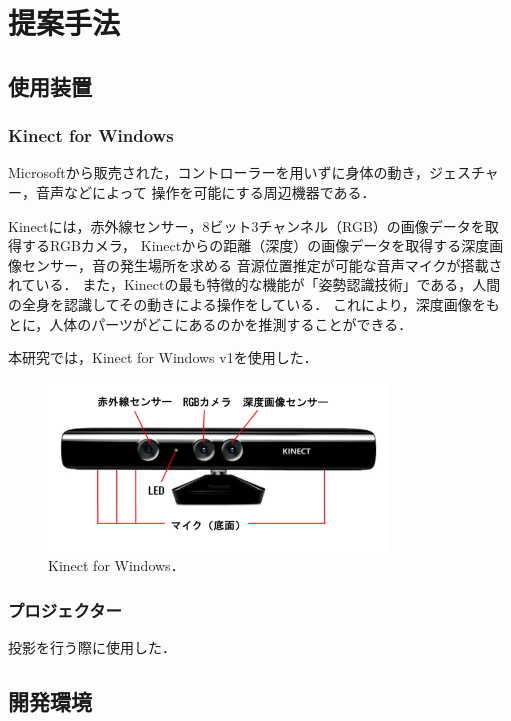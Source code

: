 \chapter{提案手法}
\thispagestyle{fancy}

\section{使用装置}
\subsection{Kinect for Windows}
Microsoftから販売された，コントローラーを用いずに身体の動き，ジェスチャー，音声などによって
操作を可能にする周辺機器である．

Kinectには，赤外線センサー，8ビット3チャンネル（RGB）の画像データを取得するRGBカメラ，
Kinectからの距離（深度）の画像データを取得する深度画像センサー，音の発生場所を求める
音源位置推定が可能な音声マイクが搭載されている．
また，Kinectの最も特徴的な機能が「姿勢認識技術」である，人間の全身を認識してその動きによる操作をしている．
これにより，深度画像をもとに，人体のパーツがどこにあるのかを推測することができる\cite{kinect}．

本研究では，Kinect for Windows v1を使用した．

\begin{figure}[b]
    \centering
    \includegraphics[width=9cm]{image/kinect.png}
    \caption[Kinect for Windows]{Kinect for Windows\cite{kinect}．}
  \label{kinect}
\end{figure}

\clearpage

\subsection{プロジェクター}
投影を行う際に使用した．


\section{開発環境}


